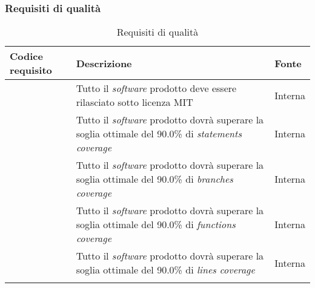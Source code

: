 \subsubsection{Requisiti di qualità}
\begin{longtabu}{|X[0.8,c]|X[3,c]|X[0.5,c]|}

  \hline 

  \textbf{Codice requisito} & \textbf{Descrizione} & \textbf{Fonte} \\ 

  \hline

   \label{rqua:mit} & Tutto il \textit{software} prodotto deve essere rilasciato sotto licenza MIT & Interna \\
  
  \hline

   \label{rqua:statements-coverage} & Tutto il \textit{software} prodotto dovrà superare la soglia ottimale del 90.0\% di \textit{statements coverage} & Interna \\
  
  \hline

   \label{rqua:branches-coverage} & Tutto il \textit{software} prodotto dovrà superare la soglia ottimale del 90.0\% di \textit{branches coverage} & Interna \\
  
  \hline

   \label{rqua:functions-coverage} & Tutto il \textit{software} prodotto dovrà superare la soglia ottimale del 90.0\% di \textit{functions coverage} & Interna \\
  
  \hline

   \label{rqua:lines-coverage} & Tutto il \textit{software} prodotto dovrà superare la soglia ottimale del 90.0\% di \textit{lines coverage} & Interna \\
  
  \hline

  \caption{Requisiti di qualità}
\end{longtabu}

